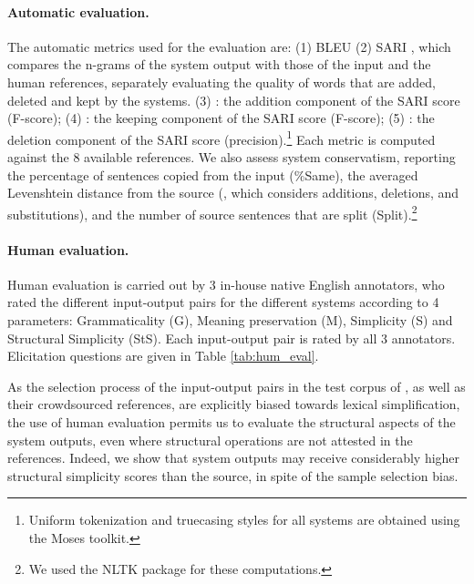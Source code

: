 \documentclass[11pt,a4paper]{article}
\begin{document}
\vspace{-0.2cm}
\paragraph{Automatic evaluation.}\label{sec:automatic_evaluation}
The automatic metrics used for the evaluation are: 
(1) BLEU \citep{P02}
(2) SARI \citep[System output Against References and against the Input sentence;][]{Xu16}, which compares the n-grams of the system output with those
of the input and the human references, separately evaluating  the  quality  of  words  that  are  added, deleted and kept by the systems. 
(3) : the addition component of the SARI score (F-score);
(4) : the keeping component of the SARI score (F-score); (5) {\bf }: the deletion component of the SARI score (precision).\footnote{Uniform tokenization and truecasing styles for all systems are obtained using the Moses toolkit.}
Each metric is computed against the 8 available references.
We also assess system conservatism, reporting the percentage of sentences copied from the input (\%Same), the averaged Levenshtein distance from the source (, which considers additions, deletions, and substitutions), and the number of source sentences that are split (Split).\footnote{We used the NLTK package \citep{LB02} for these computations.}

\vspace{-0.2cm}
\paragraph{Human evaluation.} \label{sec:human_evaluation}
Human evaluation is carried out by 3 in-house native English annotators, 
who rated the different input-output pairs for the different systems according to 4 parameters: Grammaticality (G), 
Meaning preservation (M), Simplicity (S) and Structural Simplicity (StS). Each input-output pair is rated by all 3 annotators.
Elicitation questions are given in Table \ref{tab:hum_eval}.

As the selection process of the input-output pairs in the test corpus of \citet{Xu16}, as well as their crowdsourced references, are explicitly biased towards lexical simplification, the use of human evaluation permits us to evaluate the structural aspects of the system outputs, even where structural operations are not attested in the references. Indeed, we show that system outputs may receive considerably higher structural simplicity scores than the source, in spite of the sample selection bias.
\end{document}
